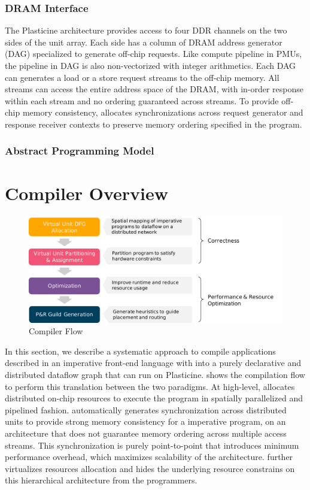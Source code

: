 \subsubsection{DRAM Interface}
The Plasticine architecture provides access to four DDR channels on the two sides of the
unit array. Each side has a column of DRAM address generator (DAG) specialized to generate off-chip
requests. Like compute pipeline in PMUs, the pipeline in DAG is also non-vectorized with integer
arithmetics. Each DAG can generates a load or a store request streams to the off-chip memory. All
streams can access the entire address space of the DRAM, with in-order response within each stream
and no ordering guaranteed across streams. To provide off-chip memory consistency, \name allocates
synchronizations across request generator and response receiver contexts to preserve memory ordering
specified in the program.

\subsubsection{Abstract Programming Model}

\section{Compiler Overview}

\begin{figure}
\centering
\includegraphics[width=1\textwidth]{figs/sarastack.pdf}
\caption[\name Compiler Flow]{\name Compiler Flow}
\label{fig:flow}
\end{figure}
 
In this section, we describe a systematic approach to compile applications described in an
imperative front-end language with into a purely declarative and distributed dataflow graph that can
run on Plasticine.
 shows the compilation flow to perform this translation between the two paradigms.
At high-level, \name allocates distributed on-chip resources to execute the program in spatially parallelized and
pipelined fashion.
\name automatically generates synchronization across distributed units to provide strong 
memory consistency for a imperative program, on an architecture that does not guarantee memory
ordering across multiple access streams.
This synchronization is purely point-to-point that introduces minimum performance overhead, which
maximizes scalability of the architecture.
\name further virtualizes resources allocation and hides the underlying resource constrains on
this hierarchical architecture from the programmers.

